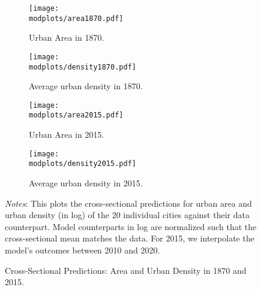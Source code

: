 \documentclass[11pt]{report}
\newcommand{\round}{revision3}  %
\newcommand{\modplots}{../../output/model/plots/\round}
\newcommand{\ptwo}{0.5}  %
\newcommand{\parboxadjust}{1.1}
\begin{document}
\begin{figure}[h!]
	\hspace{1cm}
	\begin{adjustbox}{center}
		\parbox{\parboxadjust\textwidth}{\lineskip=0pt
			
			\begin{subfigure}{\ptwo\textwidth}
					\texttt{[image: \\modplots/area1870.pdf]}
				\caption{Urban Area in 1870.\label{fig:area1870}}
			\end{subfigure}%
			\begin{subfigure}{\ptwo\textwidth}
					\texttt{[image: \\modplots/density1870.pdf]}
				\caption{Average urban density in 1870.\label{fig:density1870}}
			\end{subfigure}%
			
			\begin{subfigure}{\ptwo\textwidth}
					\texttt{[image: \\modplots/area2015.pdf]}		%
				\caption{Urban Area in 2015.\label{fig:area2015}}
			\end{subfigure}%
			\begin{subfigure}{\ptwo\textwidth}
						\texttt{[image: \\modplots/density2015.pdf]}
				\caption{Average urban density in 2015.\label{fig:density2015}}
			\end{subfigure}%
		}
	\end{adjustbox}
	\caption{Cross-Sectional Predictions: Area and Urban Density in 1870 and 2015.\label{fig:crosssection18702020}}
	{\footnotesize \textit{Notes}: This plots the cross-sectional predictions for urban area and urban density (in log) of the 20 individual cities against their data counterpart. Model counterparts in log are normalized such that the cross-sectional mean matches the data. For 2015, we interpolate the model's outcomes between 2010 and 2020.}
\end{figure}
\end{document}
